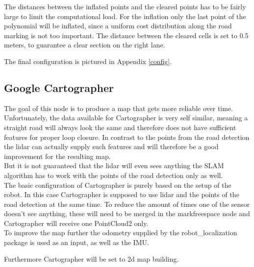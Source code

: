 The distances between the inflated points and the cleared points has to be fairly large to limit the computational load. For the inflation only the last point of the polynomial will be inflated, since a uniform cost distribution along the road marking is not too important. The distance between the cleared cells is set to 0.5 meters, to guarantee a clear section on the right lane.

The final configuration is pictured in Appendix \ref{config}.


\subsection{Google Cartographer}
The goal of this node is to produce a map that gets more reliable over time.\\

Unfortunately, the data available for Cartographer is very self similar, meaning a straight road will always look the same and therefore does not have sufficient features for proper loop closure. In contrast to the points from the road detection the lidar can actually supply such features and will therefore be a good improvement for the resulting map.\\

But it is not guaranteed that the lidar will even sees anything the SLAM algorithm has to work with the points of the road detection only as well.\\

The basic configuration of Cartographer is purely based on the setup of the robot. In this case Cartographer is supposed to use lidar and the points of the road detection at the same time. To reduce the amount of times one of the sensor doesn't see anything, these will need to be merged in the markfreespace node and Cartographer will receive one PointCloud2 only.\\
To improve the map further the odometry supplied by the robot\_localization package is used as an input, as well as the IMU.

Furthermore Cartographer will be set to 2d map building.


